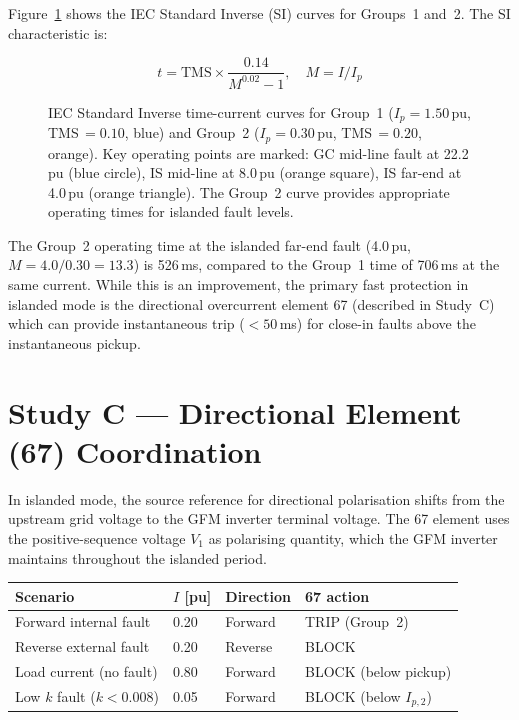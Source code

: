 \documentclass[11pt,a4paper]{article}
\begin{document}
Figure~\ref{fig:curves} shows the IEC Standard Inverse (SI) curves for
Groups~1 and~2.  The SI characteristic is:

\begin{equation}
  t = \mathrm{TMS} \times \frac{0.14}{M^{0.02}-1}, \quad M = I/I_p
\end{equation}

\begin{figure}[htbp]
  \centering
  \resizebox{0.90\textwidth}{!}{}
  \caption{IEC Standard Inverse time-current curves for Group~1
           ($I_p=1.50$\,pu, TMS\,$=0.10$, blue) and Group~2
           ($I_p=0.30$\,pu, TMS\,$=0.20$, orange).  Key operating points
           are marked: GC mid-line fault at 22.2\,pu (blue circle),
           IS mid-line at 8.0\,pu (orange square), IS far-end at 4.0\,pu
           (orange triangle).  The Group~2 curve provides appropriate
           operating times for islanded fault levels.}
  \label{fig:curves}
\end{figure}

\noindent
The Group~2 operating time at the islanded far-end fault (4.0\,pu,
$M=4.0/0.30=13.3$) is 526\,ms, compared to the Group~1 time of 706\,ms at
the same current.  While this is an improvement, the primary fast protection
in islanded mode is the directional overcurrent element 67 (described in
Study~C) which can provide instantaneous trip ($<50$\,ms) for close-in faults
above the instantaneous pickup.

\section{Study C --- Directional Element (67) Coordination}
\label{sec:studyC}

In islanded mode, the source reference for directional polarisation shifts
from the upstream grid voltage to the GFM inverter terminal voltage.  The 67
element uses the positive-sequence voltage $V_1$ as polarising quantity, which
the GFM inverter maintains throughout the islanded period.

\begin{center}
\begin{tabular}{@{}llll@{}}
\toprule
Scenario & $I$ [pu] & Direction & 67 action \\
\midrule
Forward internal fault & 0.20 & Forward & TRIP (Group~2) \\
Reverse external fault & 0.20 & Reverse & BLOCK \\
Load current (no fault) & 0.80 & Forward & BLOCK (below pickup) \\
Low $k$ fault ($k<0.008$) & 0.05 & Forward & BLOCK (below $I_{p,2}$) \\
\bottomrule
\end{tabular}
\end{center}
\end{document}
